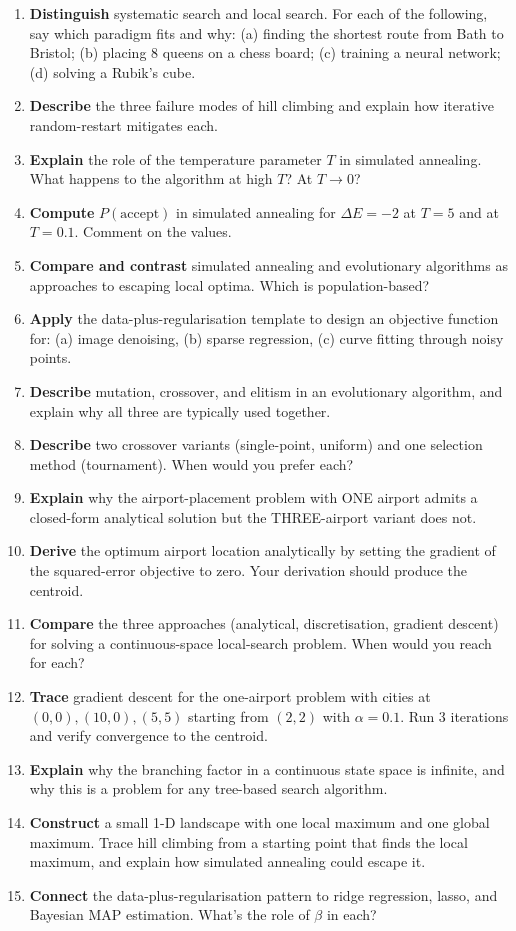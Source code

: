 \documentclass[11pt, a4paper]{article}
\begin{document}
\begin{enumerate}
  \item \textbf{Distinguish} systematic search and local search. For each of the following, say which paradigm fits and why: (a) finding the shortest route from Bath to Bristol; (b) placing 8 queens on a chess board; (c) training a neural network; (d) solving a Rubik's cube.
  \item \textbf{Describe} the three failure modes of hill climbing and explain how iterative random-restart mitigates each.
  \item \textbf{Explain} the role of the temperature parameter $T$ in simulated annealing. What happens to the algorithm at high $T$? At $T \to 0$?
  \item \textbf{Compute} $P(\text{accept})$ in simulated annealing for $\Delta E = -2$ at $T = 5$ and at $T = 0.1$. Comment on the values.
  \item \textbf{Compare and contrast} simulated annealing and evolutionary algorithms as approaches to escaping local optima. Which is population-based?
  \item \textbf{Apply} the data-plus-regularisation template to design an objective function for: (a) image denoising, (b) sparse regression, (c) curve fitting through noisy points.
  \item \textbf{Describe} mutation, crossover, and elitism in an evolutionary algorithm, and explain why all three are typically used together.
  \item \textbf{Describe} two crossover variants (single-point, uniform) and one selection method (tournament). When would you prefer each?
  \item \textbf{Explain} why the airport-placement problem with ONE airport admits a closed-form analytical solution but the THREE-airport variant does not.
  \item \textbf{Derive} the optimum airport location analytically by setting the gradient of the squared-error objective to zero. Your derivation should produce the centroid.
  \item \textbf{Compare} the three approaches (analytical, discretisation, gradient descent) for solving a continuous-space local-search problem. When would you reach for each?
  \item \textbf{Trace} gradient descent for the one-airport problem with cities at $(0, 0), (10, 0), (5, 5)$ starting from $(2, 2)$ with $\alpha = 0.1$. Run 3 iterations and verify convergence to the centroid.
  \item \textbf{Explain} why the branching factor in a continuous state space is infinite, and why this is a problem for any tree-based search algorithm.
  \item \textbf{Construct} a small 1-D landscape with one local maximum and one global maximum. Trace hill climbing from a starting point that finds the local maximum, and explain how simulated annealing could escape it.
  \item \textbf{Connect} the data-plus-regularisation pattern to ridge regression, lasso, and Bayesian MAP estimation. What's the role of $\beta$ in each?
\end{enumerate}
\end{document}
